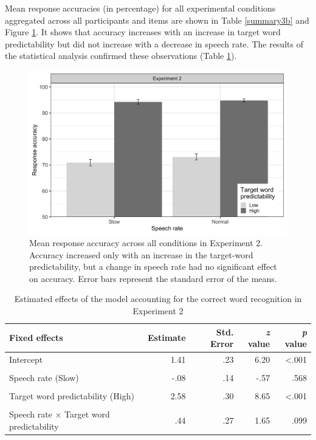 \documentclass[a4paper, nobind]{templates/ociamthesis}
\begin{document}
Mean response accuracies (in percentage) for all experimental conditions aggregated across all participants and items are shown in Table \ref{summary3b} and Figure \ref{fig:figure3b}.
It shows that accuracy increases with an increase in target word predictability
but did not increase with a decrease in speech rate.
The results of the statistical analysis confirmed these observations (Table \ref{results3b}).

\begin{figure}

{\centering \includegraphics[width=0.95\linewidth]{figures/results-fig/expt-3b} 

}

\caption{Mean response accuracy across all conditions in Experiment 2. Accuracy increased only with an increase in the target-word predictability, but a change in speech rate had no significant effect on accuracy. Error bars represent the standard error of the means.}\label{fig:figure3b}
\end{figure}

\begin{table}[ht]
\begin{center}
\caption{Estimated effects of the model accounting for the correct word recognition in Experiment 2}
\label{results3b} 
\vskip 0.12in
\begin{tabular}[]{@{}lrrrr@{}}
\toprule
Fixed effects & Estimate & Std. Error & \emph{z} value & \emph{p}
value \\
\midrule
Intercept & 1.41 & .23 & 6.20 & \textless.001 \\
\\
Speech rate (Slow) & -.08 & .14 & -.57 & .568 \\
\\
Target word predictability (High) & 2.58 & .30 & 8.65 & \textless.001 \\
\\
Speech rate $\times$ Target word predictability & .44 & .27 & 1.65 & .099 \\
\bottomrule
\end{tabular} 
\end{center} 
\end{table}
\end{document}
